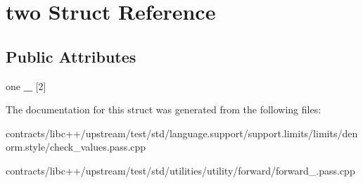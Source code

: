 \hypertarget{structtwo}{}\section{two Struct Reference}
\label{structtwo}
\subsection*{Public Attributes}
\begin{DoxyCompactItemize}
\item 
\mbox{\label{structtwo_af8c92b05a7c3a261683292d76132ad32}} 
one {\bfseries \+\_\+} \mbox{[}2\mbox{]}
\end{DoxyCompactItemize}


The documentation for this struct was generated from the following files\+:\begin{DoxyCompactItemize}
\item 
contracts/libc++/upstream/test/std/language.\+support/support.\+limits/limits/denorm.\+style/check\+\_\+values.\+pass.\+cpp\item 
contracts/libc++/upstream/test/std/utilities/utility/forward/forward\+\_.\+pass.\+cpp\end{DoxyCompactItemize}
